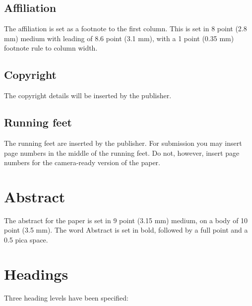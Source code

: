 \documentclass{ecai}  %
\begin{document}
\subsection{Affiliation}
The affiliation is set as a footnote to the first column. This is set
in 8 point (2.8 mm) medium with leading of 8.6 point (3.1 mm), with a
1 point (0.35 mm) footnote rule to column width.

\subsection{Copyright}
The copyright details will be inserted by the publisher.

\subsection{Running feet}
The running feet are inserted by the publisher. For submission you may
insert page numbers in the middle of the running feet. Do not,
however, insert page numbers for the camera-ready version of the
paper.

\section{Abstract}
The abstract for the paper is set in 9 point (3.15 mm) medium, on a
body of 10 point (3.5 mm). The word Abstract is set in bold, followed
by a full point and a 0.5 pica space.

\section{Headings}\label{heads}
Three heading levels have been specified:
\end{document}
